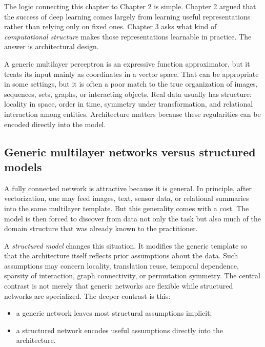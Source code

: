 The logic connecting this chapter to Chapter 2 is simple.
Chapter 2 argued that the success of deep learning comes largely from learning useful representations rather than relying only on fixed ones.
Chapter 3 asks what kind of \emph{computational structure} makes those representations learnable in practice.
The answer is architectural design.

\medskip

A generic multilayer perceptron is an expressive function approximator, but it treats its input mainly as coordinates in a vector space.
That can be appropriate in some settings, but it is often a poor match to the true organization of images, sequences, sets, graphs, or interacting objects.
Real data usually has structure:
locality in space,
order in time,
symmetry under transformation,
and relational interaction among entities.
Architecture matters because these regularities can be encoded directly into the model.

\subsection*{Generic multilayer networks versus structured models}

A fully connected network is attractive because it is general.
In principle, after vectorization, one may feed images, text, sensor data, or relational summaries into the same multilayer template.
But this generality comes with a cost.
The model is then forced to discover from data not only the task but also much of the domain structure that was already known to the practitioner.

\medskip

A \emph{structured model} changes this situation.
It modifies the generic template so that the architecture itself reflects prior assumptions about the data.
Such assumptions may concern locality, translation reuse, temporal dependence, sparsity of interaction, graph connectivity, or permutation symmetry.
The central contrast is not merely that generic networks are flexible while structured networks are specialized.
The deeper contrast is this:

\begin{itemize}
    \item a generic network leaves most structural assumptions implicit;
    \item a structured network encodes useful assumptions directly into the architecture.
\end{itemize}

